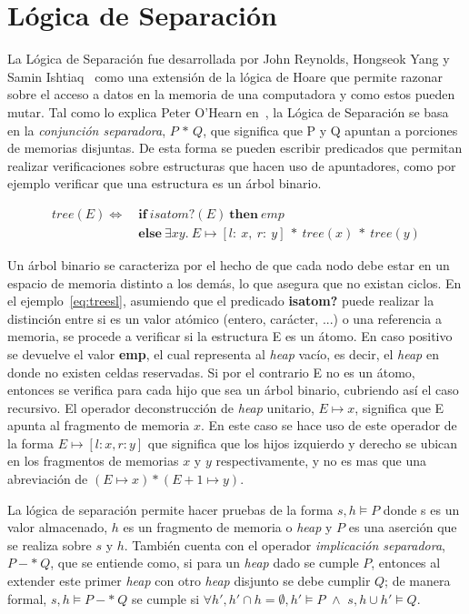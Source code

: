 \section{Lógica de Separación}

La Lógica de Separación fue desarrollada por John Reynolds, Hongseok Yang y
Samin Ishtiaq~\cite{seplogpaper1,seplogpaper2,seplogpaper3} como una
extensión de la lógica de Hoare que permite razonar sobre el acceso a datos en
la memoria de una computadora y como estos pueden mutar. Tal como lo explica
Peter O'Hearn en~\cite{separation-logic}, la Lógica de Separación se basa en
la \textit{conjunción separadora}, $P\, \ast\, Q$, que significa que P y Q apuntan a
porciones de memorias disjuntas. De esta forma se pueden escribir predicados
que permitan realizar verificaciones sobre estructuras que hacen uso de
apuntadores, como por ejemplo verificar que una estructura es un árbol
binario.

\begin{align}
  tree(E) \Longleftrightarrow\ &\boldsymbol{if}\ isatom?(E)\ \boldsymbol{then}\ emp \label{eq:treesl}\\
             &\boldsymbol{else}\ \exists xy.\ E\mapsto[l:\ x,\ r:\ y]\ *\ tree(x)\ *\ tree(y) \nonumber
\end{align}

Un árbol binario se caracteriza por el hecho de que cada nodo debe estar en un
espacio de memoria distinto a los demás, lo que asegura que no existan ciclos.
En el ejemplo~\ref{eq:treesl}, asumiendo que el predicado \textbf{isatom?} puede
realizar la distinción entre si es un valor atómico (entero, carácter, ...) o
una referencia a memoria, se procede a verificar si la estructura E es un átomo.
En caso positivo se devuelve el valor \textbf{emp}, el cual representa al
\textit{heap} vacío, es decir, el \textit{heap} en donde no existen celdas
reservadas. Si por el contrario E no es un átomo, entonces se verifica para cada
hijo que sea un árbol binario, cubriendo así el caso recursivo. El operador
deconstrucción de \textit{heap} unitario, $E \mapsto x$, significa que E apunta al
fragmento de memoria $x$. En este caso se hace uso de este operador de la forma
$E\mapsto [l: x, r: y]$ que significa que los hijos izquierdo y derecho se
ubican en los fragmentos de memorias $x$ y $y$ respectivamente, y no es mas que
una abreviación de $(E\mapsto x) * (E+1\mapsto y)$.

La lógica de separación permite hacer pruebas de la forma $s,h
\vDash P$ donde s es un valor almacenado, $h$ es un fragmento de memoria o
\textit{heap} y $P$ es una aserción que se realiza sobre $s$ y $h$. También cuenta
con el operador \textit{implicación separadora}, $P-*\ Q$, que se entiende como, si
para un \textit{heap} dado se cumple $P$, entonces al extender este primer
\textit{heap} con otro \textit{heap} disjunto se debe cumplir $Q$; de manera
formal, $s, h \vDash P-*\ Q$ se cumple si $\forall h', h' \cap h = \emptyset, h' \vDash
P\,\, \land \,\, s, h \cup h' \vDash Q$.
